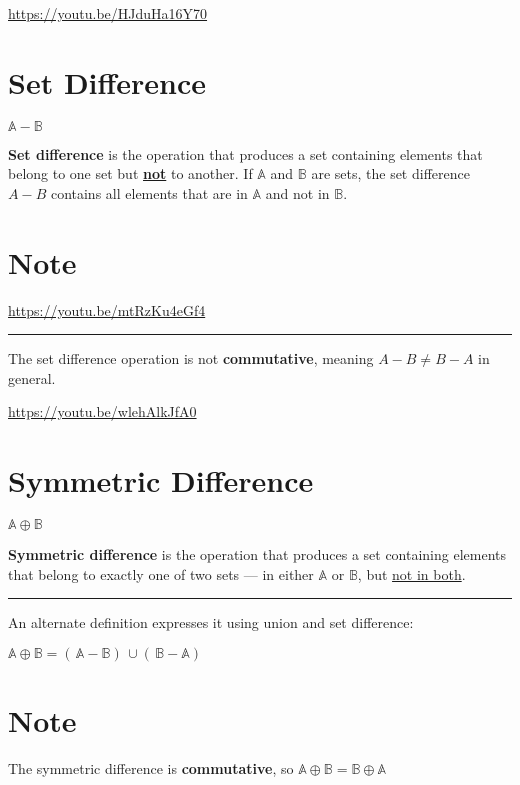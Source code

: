 \documentclass[
  letterpaper,
  DIV=11,
  numbers=noendperiod]{scrreprt}
\begin{document}
\url{https://youtu.be/HJduHa16Y70}

\section{Set Difference}

\(\mathbb{A} - \mathbb{B}\)

{\textbf{Set difference}} is the operation that produces a set
containing elements that belong to one set but {\ul{\textbf{not}}} to
another. If \(\mathbb{A}\) and \(\mathbb{B}\) are sets, the set
difference \(A -B\) contains all elements that are in \(\mathbb{A}\) and
not in \(\mathbb{B}\).

\section{Note}

\url{https://youtu.be/mtRzKu4eGf4}

\begin{center}\rule{0.5\linewidth}{0.5pt}\end{center}

The set difference operation is not {\textbf{commutative}}, meaning
\(A - B \neq B - A\) in general.

\url{https://youtu.be/wlehAlkJfA0}

\section{Symmetric Difference}

\(\mathbb{A} \oplus \mathbb{B}\)

{\textbf{Symmetric difference}} is the operation that produces a set
containing elements that belong to exactly one of two sets --- in either
\(\mathbb{A}\) or \(\mathbb{B}\), but \ul{not in both}.

\begin{center}\rule{0.5\linewidth}{0.5pt}\end{center}

An alternate definition expresses it using union and set difference:

\(\mathbb{A} \oplus \mathbb{B}= ( \, \mathbb{A} - \mathbb{B} ) \, \cup ( \, \mathbb{B} - \mathbb{A} ) \,\)

\section{Note}

The symmetric difference is {\textbf{commutative}}, so
\(\mathbb{A} \oplus \mathbb{B} = \mathbb{B} \oplus \mathbb{A}\)
\end{document}
